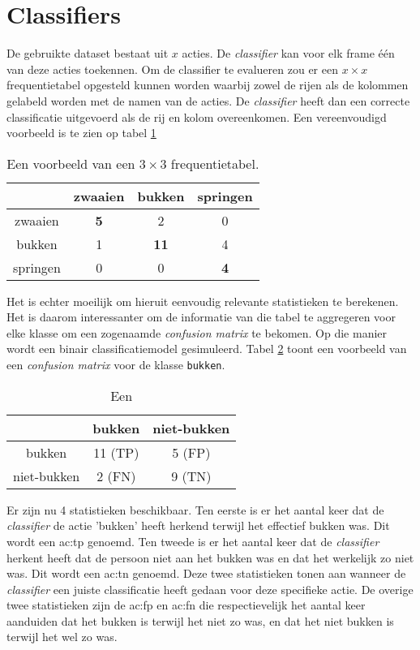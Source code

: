 \section{Classifiers}
\label{ch:evaluatie}
De gebruikte dataset bestaat uit $x$ acties. De \textit{classifier} kan voor elk frame één van deze acties toekennen. Om de classifier te evalueren zou er een $x \times x$ frequentietabel opgesteld kunnen worden waarbij zowel de rijen als de kolommen gelabeld worden met de namen van de acties. De \textit{classifier} heeft dan een correcte classificatie uitgevoerd als de rij en kolom overeenkomen. Een vereenvoudigd voorbeeld is te zien op tabel \ref{table:example_evaluation}
\begin{table}[ht]
	\centering
	\begin{tabular}{| c | ccc |}
		\hline
				& zwaaien & bukken & springen \\
				\hline
		zwaaien & \textbf{5} & 2 & 0 \\
		bukken & 1 & \textbf{11} & 4 \\
		springen & 0 & 0 & \textbf{4} \\
		\hline
		
	\end{tabular}
	\caption{Een voorbeeld van een $3 \times 3$ frequentietabel.}
	\label{table:example_evaluation}
\end{table}

Het is echter moeilijk om hieruit eenvoudig relevante statistieken te berekenen. Het is daarom interessanter om de informatie van die tabel te aggregeren voor elke klasse om een zogenaamde \textit{confusion matrix} te bekomen. Op die manier wordt een binair classificatiemodel gesimuleerd. Tabel \ref{table:example_evaluation_aggregate} toont een voorbeeld van een \textit{confusion matrix} voor de klasse \texttt{bukken}. 
\begin{table}[ht]
	\centering
	\begin{tabular}{| c | cc |}
		\hline
		& bukken & niet-bukken \\
		\hline
		bukken & 11 (TP) & 5 (FP) \\
		niet-bukken & 2 (FN) & 9 (TN)\\
		\hline
	\end{tabular}
	\caption{Een}
	\label{table:example_evaluation_aggregate}
\end{table}

Er zijn nu 4 statistieken beschikbaar. Ten eerste is er het aantal keer dat de \textit{classifier} de actie 'bukken' heeft herkend terwijl het effectief bukken was. Dit wordt een \gls{ac:tp} genoemd. Ten tweede is er het aantal keer dat de \textit{classifier} herkent heeft dat de persoon niet aan het bukken was en dat het werkelijk zo niet was. Dit wordt een \gls{ac:tn} genoemd. Deze twee statistieken tonen aan wanneer de \textit{classifier} een juiste classificatie heeft gedaan voor deze specifieke actie. De overige twee statistieken zijn de \gls{ac:fp} en \gls{ac:fn} die respectievelijk het aantal keer aanduiden dat het bukken is terwijl het niet zo was, en dat het niet bukken is terwijl het wel zo was. 

